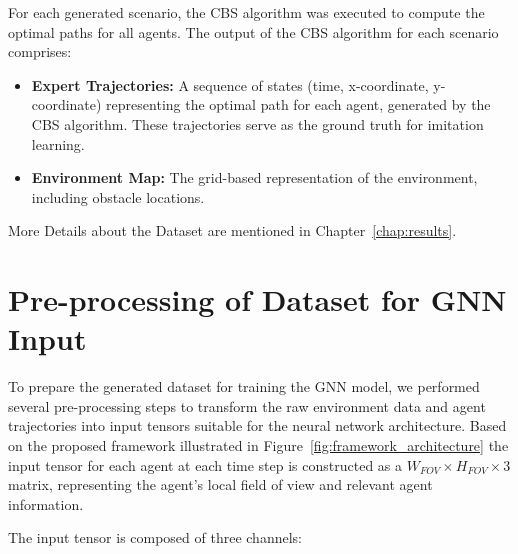 For each generated scenario, the CBS algorithm was executed to compute the optimal paths for all agents. The output of the CBS algorithm for each scenario comprises:

\begin{itemize}
    \item \textbf{Expert Trajectories:} A sequence of states (time, x-coordinate, y-coordinate) representing the optimal path for each agent, generated by the CBS algorithm. These trajectories serve as the ground truth for imitation learning.
    \item \textbf{Environment Map:} The grid-based representation of the environment, including obstacle locations.
\end{itemize}

More Details about the Dataset are mentioned in Chapter~\ref{chap:results}.

\section{Pre-processing of Dataset for GNN Input}

To prepare the generated dataset for training the GNN model, we performed several pre-processing steps to transform the raw environment data and agent trajectories into input tensors suitable for the neural network architecture. Based on the proposed framework illustrated in Figure~\ref{fig:framework_architecture} the input tensor for each agent at each time step is constructed as a $W_{FOV} \times H_{FOV} \times 3$ matrix, representing the agent's local field of view and relevant agent information.

The input tensor is composed of three channels:

